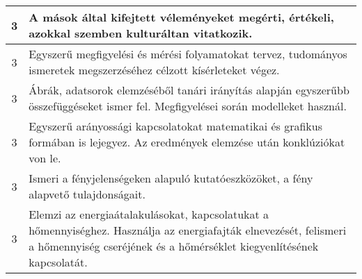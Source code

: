 \begin{longtable}{c | p{} }
                                
                                          3 &  A mások által kifejtett véleményeket megérti, értékeli, azokkal szemben kulturáltan vitatkozik. \\ \hline
                                          3 &  Egyszerű megfigyelési és mérési folyamatokat tervez, tudományos ismeretek megszerzéséhez célzott kísérleteket végez. \\ \hline
                                          3 &  Ábrák, adatsorok elemzéséből tanári irányítás alapján egyszerűbb összefüggéseket ismer fel. Megfigyelései során modelleket használ.  \\ \hline
                                          3 &  Egyszerű arányossági kapcsolatokat matematikai és grafikus formában is lejegyez. Az eredmények elemzése után konklúziókat von le. \\ \hline
                                          3 &  Ismeri a fényjelenségeken alapuló kutatóeszközöket, a fény alapvető tulajdonságait. \\ \hline
                                          3 &  Elemzi az energiaátalakulásokat, kapcsolatukat a hőmennyiséghez. Használja az energiafajták elnevezését, felismeri a hőmennyiség cseréjének és a hőmérséklet kiegyenlítésének kapcsolatát. \\ \hline
                                      

\end{longtable}
